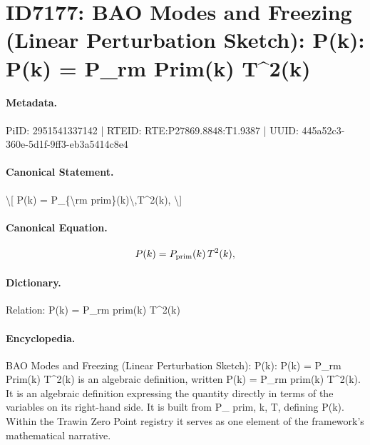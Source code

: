 \section*{ID7177: BAO Modes and Freezing (Linear Perturbation Sketch): P(k): P(k) = P\_rm Prim(k) T\textasciicircum{}2(k)}
\paragraph{Metadata.}
PiID: 2951541337142 | RTEID: RTE:P27869.8848:T1.9387 | UUID: 445a52c3-360e-5d1f-9ff3-eb3a5414c8e4

\paragraph{Canonical Statement.}
\textbackslash{}[ P(k) = P\_\{\textbackslash{}rm prim\}(k)\textbackslash{},T\textasciicircum{}2(k), \textbackslash{}]

\paragraph{Canonical Equation.}
\[
P(k) = P_{\rm prim}(k)\,T^2(k),
\]

\paragraph{Dictionary.}
Relation: P(k) = P\_rm prim(k) T\textasciicircum{}2(k)

\paragraph{Encyclopedia.}
BAO Modes and Freezing (Linear Perturbation Sketch): P(k): P(k) = P\_rm Prim(k) T\textasciicircum{}2(k) is an algebraic definition, written P(k) = P\_rm prim(k) T\textasciicircum{}2(k). It is an algebraic definition expressing the quantity directly in terms of the variables on its right-hand side. It is built from P\_ prim, k, T, defining P(k). Within the Trawin Zero Point registry it serves as one element of the framework's mathematical narrative.
